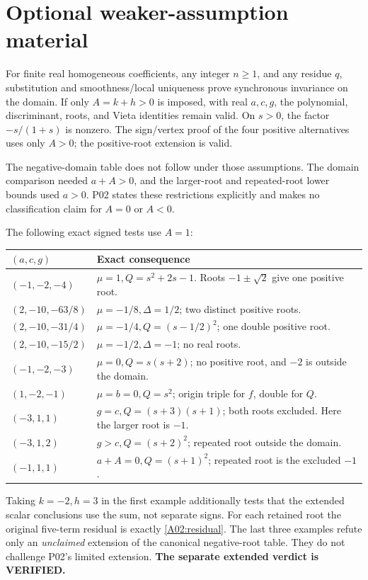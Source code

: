 \documentclass[11pt]{article}
\begin{document}
\section{Optional weaker-assumption material}

For finite real homogeneous coefficients, any integer \(n\ge1\),
and any residue \(q\), substitution and smoothness/local uniqueness
prove synchronous invariance on the domain. If only \(A=k+h>0\)
is imposed, with real \(a,c,g\), the polynomial, discriminant, roots,
and Vieta identities remain valid. On \(s>0\), the factor
\(-s/(1+s)\) is nonzero. The sign/vertex proof of the four positive
alternatives uses only \(A>0\); the positive-root extension is valid.

The negative-domain table does not follow under those assumptions.
The domain comparison needed \(a+A>0\), and the larger-root and
repeated-root lower bounds used \(a>0\). P02 states these restrictions
explicitly and makes no classification claim for \(A=0\) or \(A<0\).

The following exact signed tests use \(A=1\):
\begin{longtable}{@{}P{0.30\textwidth}P{0.62\textwidth}@{}}
\toprule
\((a,c,g)\) & Exact consequence\\
\midrule
\endhead
\((-1,-2,-4)\) & \(\mu=1,Q=s^2+2s-1\).
Roots \(-1\pm\sqrt2\) give one positive root.\\
\((2,-10,-63/8)\) & \(\mu=-1/8,\Delta=1/2\);
two distinct positive roots.\\
\((2,-10,-31/4)\) & \(\mu=-1/4,Q=(s-1/2)^2\);
one double positive root.\\
\((2,-10,-15/2)\) & \(\mu=-1/2,\Delta=-1\); no real roots.\\
\((-1,-2,-3)\) & \(\mu=0,Q=s(s+2)\); no positive root,
and \(-2\) is outside the domain.\\
\((1,-2,-1)\) & \(\mu=b=0,Q=s^2\); origin triple for \(f\), double for \(Q\).\\
\((-3,1,1)\) & \(g=c,Q=(s+3)(s+1)\); both roots excluded.
Here the larger root is \(-1\).\\
\((-3,1,2)\) & \(g>c,Q=(s+2)^2\); repeated root outside the domain.\\
\((-1,1,1)\) & \(a+A=0,Q=(s+1)^2\); repeated root is the excluded \(-1\).\\
\bottomrule
\end{longtable}
Taking \(k=-2,h=3\) in the first example additionally tests that the
extended scalar conclusions use the sum, not separate signs.
For each retained root the original five-term residual is exactly
\eqref{A02:residual}. The last three examples refute only an
\emph{unclaimed} extension of the canonical negative-root table.
They do not challenge P02's limited extension.
\textbf{The separate extended verdict is VERIFIED.}
\end{document}
